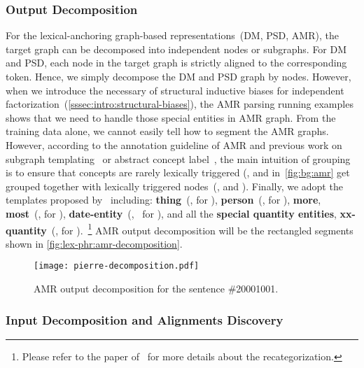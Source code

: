 \subsubsection{Output Decomposition}
\label{sssec:lex-phr:lex-output-decomposition}
For the lexical-anchoring graph-based representations~(DM, PSD, AMR),
the target graph can be decomposed into independent nodes or
subgraphs. For DM and PSD, each node in the target graph is strictly
aligned to the corresponding token. Hence, we simply decompose the DM
and PSD graph by nodes. However, when we introduce the necessary of
structural inductive biases for independent
factorization~(\autoref{sssec:intro:structural-biases}), the AMR
parsing running examples shows that we need to handle those special
entities in AMR graph.  From the training data alone, we cannot easily
tell how to segment the AMR graphs. However, according to the
annotation guideline of AMR and previous work on subgraph
templating~\cite{Werling:2015up} or abstract concept
label~\cite{Wang:2017vt}, the main intuition of grouping is to ensure
that concepts are rarely lexically triggered (\eg, 
and  in~\autoref{fig:bg:amr} get grouped
together with lexically triggered nodes~(\eg,  and ). Finally, we adopt the templates
proposed by~\citet{lyu2018amr} including: \textbf{thing}~(\eg,
 for ),
\textbf{person}~(\eg,  for
), \textbf{more}, \textbf{most}~(\eg,
 for
), \textbf{date-entity}~(\eg,~ for ), and all the \textbf{special quantity
entities}, \textbf{xx-quantity}~(\eg,  for ).~\footnote{Please refer
  to the paper of~\citet{lyu2018amr} for more details about the
  recategorization.} AMR output decomposition will be the rectangled segments shown in
\autoref{fig:lex-phr:amr-decomposition}.
\begin{figure}[!tbp]
  \centering
  \texttt{[image: pierre-decomposition.pdf]}
  \caption{\label{fig:lex-phr:amr-decomposition} AMR output
    decomposition for the sentence \#20001001.}
\end{figure}

\subsubsection{Input Decomposition and Alignments Discovery}
\label{sssec:lex-phr:lex-input-decomposition}

